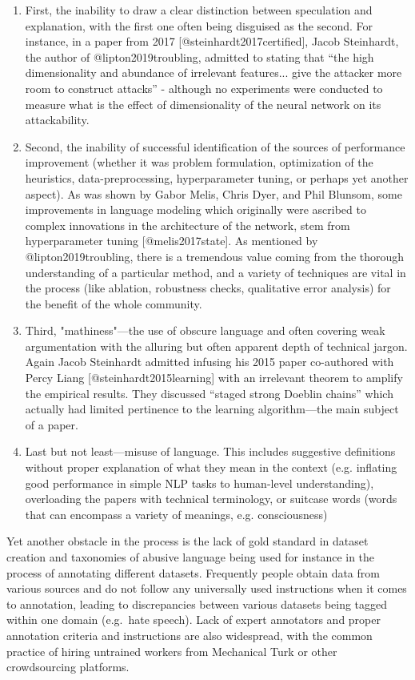 \documentclass[
  10pt,
  dvipsnames,enabledeprecatedfontcommands]{scrartcl}
\begin{document}
\renewcommand{\labelenumii}{\Roman{enumii}}
 \begin{enumerate}
\item First, the inability to draw a clear distinction between speculation and explanation, with the first one often being disguised as the second. For instance, in a paper from 2017 [@steinhardt2017certified], Jacob Steinhardt, the author of @lipton2019troubling, admitted to stating that “the high dimensionality and abundance of irrelevant features... give the attacker more room to construct attacks” - although no experiments were conducted to measure what is the effect of dimensionality of the neural network on its attackability. 
\item Second, the inability of successful identification of the sources of performance improvement (whether it was problem formulation, optimization of the heuristics, data-preprocessing, hyperparameter tuning, or perhaps yet another aspect). As was shown by Gabor Melis, Chris Dyer, and Phil Blunsom, some improvements in language modeling which originally were ascribed to complex innovations in the architecture of the network, stem from hyperparameter tuning [@melis2017state]. As mentioned by @lipton2019troubling, there is a tremendous value coming from the thorough understanding of a particular method, and a variety of techniques are vital in the process (like ablation, robustness checks, qualitative error analysis) for the benefit of the whole community.
\item Third, "mathiness"---the use of obscure language and often covering weak argumentation with the alluring but often apparent depth of technical jargon. Again Jacob Steinhardt admitted infusing his 2015 paper co-authored with Percy Liang [@steinhardt2015learning] with an irrelevant theorem to amplify the empirical results. They discussed “staged strong Doeblin chains” which actually had limited pertinence to the learning algorithm---the main subject of a paper. 
\item Last but not least---misuse of language. This includes suggestive definitions without proper explanation of what they mean in the context (e.g. inflating good performance in simple NLP tasks to human-level understanding), overloading the papers with technical terminology, or suitcase words (words that can encompass a variety of meanings, e.g. consciousness) 
 \end{enumerate}

Yet another obstacle in the process is the lack of gold standard in
dataset creation and taxonomies of abusive language being used for
instance in the process of annotating different datasets. Frequently
people obtain data from various sources and do not follow any
universally used instructions when it comes to annotation, leading to
discrepancies between various datasets being tagged within one domain
(e.g.~hate speech). Lack of expert annotators and proper annotation
criteria and instructions are also widespread, with the common practice
of hiring untrained workers from Mechanical Turk or other crowdsourcing
platforms.
\end{document}
